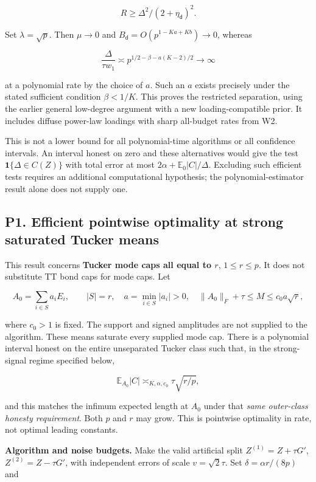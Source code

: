 \[R\ge\Delta^2/(2+\eta_{\mathsf d})^2.\]

Set \(\lambda=\sqrt p\). Then \(\mu\to0\) and
\(B_{\mathsf d}=O(p^{1-Ka+Kb})\to0\), whereas

\[\frac{\Delta}{\tau w_1}
\asymp p^{1/2-\beta-a(K-2)/2}\longrightarrow\infty\]

at a polynomial rate by the choice of \(a\). Such an \(a\) exists
precisely under the stated sufficient condition \(\beta<1/K\). This
proves the restricted separation, using the earlier general low-degree
argument with a new loading-compatible prior. It includes diffuse
power-law loadings with sharp all-budget rates from W2.

This is not a lower bound for all polynomial-time algorithms or all
confidence intervals. An interval honest on zero and these alternatives
would give the test \(\mathbf1\{\Delta\in C(Z)\}\) with total error at
most \(2\alpha+\mathbb E_0|C|/\Delta\). Excluding such efficient tests
requires an additional computational hypothesis; the
polynomial-estimator result alone does not supply one.

\subsection{P1. Efficient pointwise optimality at strong saturated
Tucker
means}\label{p1.-efficient-pointwise-optimality-at-strong-saturated-tucker-means}\label{sup:P1}

This result concerns \textbf{Tucker mode caps all equal to \(r\)},
\(1\le r\le p\). It does not substitute TT bond caps for mode caps. Let

\[A_0=\sum_{i\in S}a_i E_i,\qquad |S|=r,\quad
a=\min_{i\in S}|a_i|>0,\quad
\|A_0\|_F+\tau\le M\le c_0a\sqrt r,\]

where \(c_0>1\) is fixed. The support and signed amplitudes are not
supplied to the algorithm. These means saturate every supplied mode cap.
There is a polynomial interval honest on the entire unseparated Tucker
class such that, in the strong-signal regime specified below,

\[\mathbb E_{A_0}|C|\asymp_{K,\alpha,c_0}\tau\sqrt{r/p},\]

and this matches the infimum expected length at \(A_0\) under that
\emph{same outer-class honesty requirement}. Both \(p\) and \(r\) may
grow. This is pointwise optimality in rate, not optimal leading
constants.

\textbf{Algorithm and noise budgets.} Make the valid artificial split
\(Z^{(1)}=Z+\tau G'\), \(Z^{(2)}=Z-\tau G'\), with independent errors of
scale \(v=\sqrt2\tau\). Set \(\delta=\alpha r/(8p)\) and

